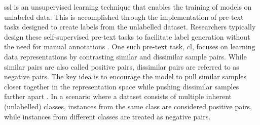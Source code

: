 \acf{ssl} is an unsupervised learning technique that enables the training of models on unlabeled data.
This is accomplished through the implementation of pre-text tasks 
designed to create labels from the unlabelled dataset.
Researchers typically design these self-supervised pre-text tasks 
to facilitate label generation without the need for manual annotations \citet{PIC_2020}.
One such pre-text task, \acf{cl}, 
focuses on learning data representations by contrasting similar and dissimilar sample pairs. 
While similar pairs are also called positive pairs, 
dissimilar pairs are referred to as negative pairs.
The key idea is to encourage the model to pull similar samples closer together in the representation space 
while pushing dissimilar samples farther apart \citet{mining_potential_2024}.
In a scenario where a dataset consists of multiple inherent (unlabelled) classes, 
instances from the same class are considered positive pairs, 
while instances from different classes are treated as negative pairs.